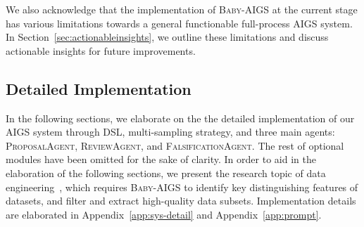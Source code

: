 \documentclass{article} %
\newcommand{\AIGS}{AIGS\xspace}
\newcommand{\AIGSSys}{\textsc{Baby-AIGS}\xspace}
\newcommand{\ProposalAgent}{\textsc{ProposalAgent}\xspace}
\newcommand{\ReviewAgent}{\textsc{ReviewAgent}\xspace}
\newcommand{\FalsificationAgent}{\textsc{FalsificationAgent}\xspace}
\newcommand{\DSL}{\textsc{DSL}\xspace}
\begin{document}
We also acknowledge that the implementation of \AIGSSys at the current stage has various limitations towards a general functionable full-process \AIGS system. In Section~\ref{sec:actionableinsights}, we outline these limitations and discuss actionable insights for future improvements. 

\subsection{Detailed Implementation}

In the following sections, we elaborate on the the detailed implementation of our \AIGS system through \DSL, multi-sampling strategy, and three main agents: \ProposalAgent, \ReviewAgent, and \FalsificationAgent. The rest of optional modules have been omitted for the sake of clarity. 
In order to aid in the elaboration of the following sections, we present the research topic of data engineering~\citep{deita,chen2024alpagasus,li-etal-2024-one,long-is-more}, which requires \AIGSSys to identify key distinguishing features of datasets, and filter and extract high-quality data subsets. 
Implementation details are elaborated in Appendix~\ref{app:sys-detail} and Appendix~\ref{app:prompt}. 


\end{document}
